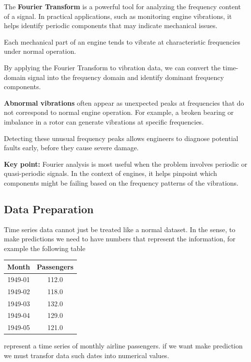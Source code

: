 \begin{infobox}
    The \textbf{Fourier Transform} is a powerful tool for analyzing the frequency content of a signal. In practical applications, such as monitoring engine vibrations, it helps identify periodic components that may indicate mechanical issues.  
    
    \begin{compactitemize}
        \item Each mechanical part of an engine tends to vibrate at characteristic frequencies under normal operation.  
        \item By applying the Fourier Transform to vibration data, we can convert the time-domain signal into the frequency domain and identify dominant frequency components.  
        \item \textbf{Abnormal vibrations} often appear as unexpected peaks at frequencies that do not correspond to normal engine operation. For example, a broken bearing or imbalance in a rotor can generate vibrations at specific frequencies.  
        \item Detecting these unusual frequency peaks allows engineers to diagnose potential faults early, before they cause severe damage.  
    \end{compactitemize}
    
    \textbf{Key point:} Fourier analysis is most useful when the problem involves periodic or quasi-periodic signals. In the context of engines, it helps pinpoint which components might be failing based on the frequency patterns of the vibrations.
\end{infobox}
    

\subsection{Data Preparation}
Time series data cannot just be treated like a normal dataset. In the sense, to make predictions we need to have numbers that represent the information, for example the following table
\begin{table}[h!]
    \centering
    \begin{tabular}{|c|c|}
    \hline
    \textbf{Month} & \textbf{Passengers} \\
    \hline
    1949-01 & 112.0 \\
    1949-02 & 118.0 \\
    1949-03 & 132.0 \\
    1949-04 & 129.0 \\
    1949-05 & 121.0 \\
    \hline
    \end{tabular}
\end{table}
represent a time series of monthly airline passengers. if we want make prediction we must transfor data such dates into numerical values. 

